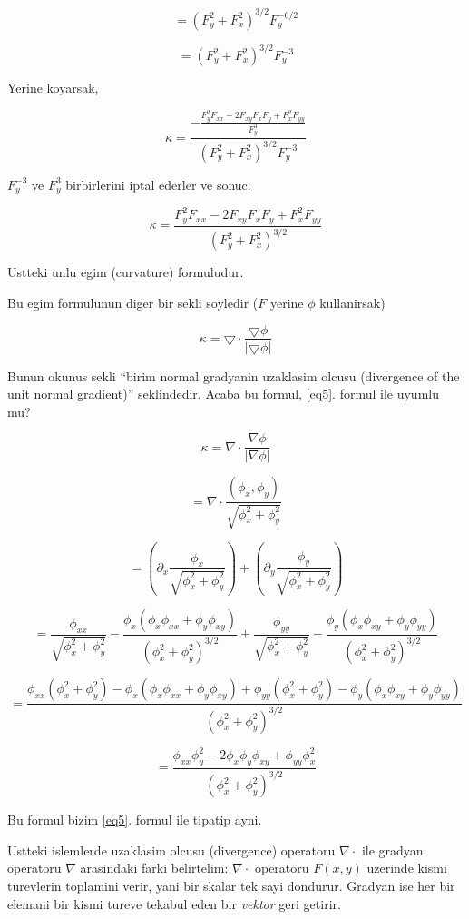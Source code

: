 \documentclass[12pt,fleqn]{article}
\begin{document}
\[ = (F_y^2 + F_x^2)^{3/2}F_y^{-6/2}  \]

\[ = (F_y^2 + F_x^2)^{3/2}F_y^{-3} \]

Yerine koyarsak,

\[ 
\kappa = \frac{\displaystyle
- \frac{F_y^2F_{xx} - 2F_{xy}F_xF_y + F_x^2F_{yy}}{F_y^3}}
{(F_y^2 + F_x^2)^{3/2}F_y^{-3}}
 \]

$F_y^{-3}$ ve $F_y^{3}$ birbirlerini iptal ederler ve sonuc:

\begin{equation}\kappa = \frac{F_y^2F_{xx} - 2F_{xy}F_xF_y + F_x^2F_{yy}}{(F_y^2 + F_x^2)^{3/2}} \label{eq5}\end{equation}

Ustteki unlu egim (curvature) formuludur. 

Bu egim formulunun diger bir sekli soyledir ($F$ yerine $\phi$ kullanirsak)

\[ \kappa = \bigtriangledown \cdot \frac{\bigtriangledown \phi}{|\bigtriangledown \phi|} \]

Bunun okunus sekli ``birim normal gradyanin uzaklasim olcusu (divergence of the
unit normal gradient)'' seklindedir. Acaba bu formul, \ref{eq5}. formul ile
uyumlu mu?

\[ \kappa = \nabla \cdot \frac{\nabla \phi}{|\nabla \phi|}  \]

\[ = \nabla \cdot \frac{(\phi_x,\phi_y)}{\sqrt{\phi_x^2+\phi_y^2}} \]

\[ = \left(\partial_x \frac{\phi_x}{\sqrt{\phi_x^2+\phi_y^2}}\right)+ 
\left(\partial_y \frac{\phi_y}{\sqrt{\phi_x^2+\phi_y^2}}\right)  \]

\[ = \frac{\phi_{xx}}{\sqrt{\phi_x^2+\phi_y^2}} - \frac{\phi_x (\phi_x\phi_{xx}+\phi_y\phi_{xy})}
{(\phi_x^2+\phi_y^2)^{3/2}} +
\frac{\phi_{yy}}{\sqrt{\phi_x^2+\phi_y^2}} - \frac{\phi_y(\phi_x\phi_{xy}+\phi_y\phi_{yy})}
{(\phi_x^2+\phi_y^2)^{3/2}}  \]

\[ = \frac{\phi_{xx}(\phi_x^2+\phi_y^2) - \phi_x
  (\phi_x\phi_{xx}+\phi_y\phi_{xy}) +\phi_{yy}(\phi_x^2+\phi_y^2) -
  \phi_y(\phi_x\phi_{xy}+\phi_y\phi_{yy})}{(\phi_x^2+\phi_y^2)^{3/2}} \]

\[ = \frac{\phi_{xx}\phi_y^2 - 2\phi_x\phi_y\phi_{xy} + \phi_{yy}\phi_x^2}{(\phi_x^2+\phi_y^2)^{3/2}}  \]

Bu formul bizim \ref{eq5}. formul ile tipatip ayni.

Ustteki islemlerde uzaklasim olcusu (divergence) operatoru $\nabla \cdot$ ile
gradyan operatoru $\nabla$ arasindaki farki belirtelim:  $\nabla \cdot$
operatoru $F(x,y)$ uzerinde kismi turevlerin toplamini verir, yani bir skalar
tek sayi dondurur. Gradyan ise her bir elemani bir kismi tureve tekabul eden bir
{\em vektor} geri getirir. 
\end{document}
